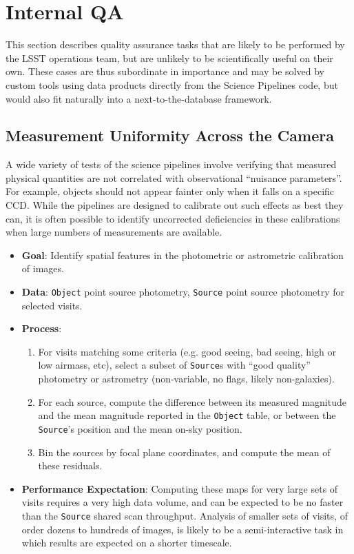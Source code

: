 \documentclass[DM,authoryear,toc]{lsstdoc}
\begin{document}
\section{Internal QA}

This section describes quality assurance tasks that are likely to be performed
by the LSST operations team, but are unlikely to be scientifically useful on
their own. These cases are thus subordinate in importance and may be solved by
custom tools using data products directly from the Science Pipelines code, but
would also fit naturally into a next-to-the-database framework.

\subsection{Measurement Uniformity Across the Camera}

A wide variety of tests of the science pipelines involve verifying that measured
physical quantities are not correlated with observational ``nuisance
parameters''. For example, objects should not appear fainter only when it falls
on a specific CCD. While the pipelines are designed to calibrate out such
effects as best they can, it is often possible to identify uncorrected
deficiencies in these calibrations when large numbers of measurements are
available.

\begin{itemize}
  \item \textbf{Goal}: Identify spatial features in the photometric or
  astrometric calibration of images.
  \item \textbf{Data}: \texttt{Object} point source photometry, \texttt{Source}
  point source photometry for selected visits.
  \item \textbf{Process}:
  \begin{enumerate}
    \item For visits matching some criteria (e.g. good seeing, bad seeing, high
    or low airmass, etc), select a subset of \texttt{Source}s with ``good quality''
    photometry or astrometry (non-variable, no flags, likely non-galaxies).
    \item For each source, compute the difference between its measured magnitude
    and the mean magnitude reported in the \texttt{Object} table, or between the
    \texttt{Source}'s position and the mean on-sky position.
    \item Bin the sources by focal plane coordinates, and compute the mean of
    these residuals.
  \end{enumerate}
  \item \textbf{Performance Expectation}: Computing these maps for very large
  sets of visits requires a very high data volume, and can be expected to be no
  faster than the \texttt{Source} shared scan throughput. Analysis of smaller
  sets of visits, of order dozens to hundreds of images, is likely to be a
  semi-interactive task in which results are expected on a shorter timescale.
\end{itemize}


\end{document}
